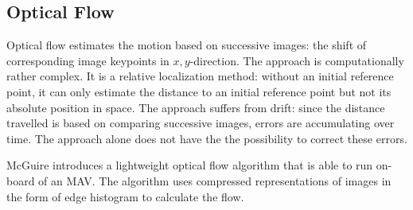 
\subsection{Optical Flow}
\label{sec:opticalflow}

Optical flow estimates the motion based on successive images: the shift of corresponding image keypoints in $x,y$-direction.
The approach is computationally rather complex. It is a relative localization method: without an initial reference point, it can only estimate the distance to an initial reference point but not its absolute position in space. The approach suffers from drift: since the distance travelled is based on comparing successive images, errors are accumulating over time. The approach alone does not have the  the possibility to correct these errors.

\citet{} McGuire introduces a lightweight optical flow algorithm that is able to run on-board of an MAV. The algorithm uses compressed representations of images in the form of edge histogram to calculate the flow.   